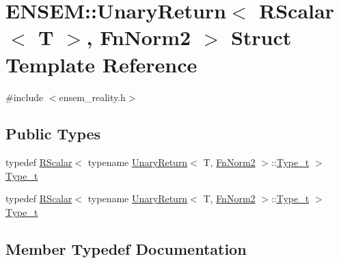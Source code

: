 \hypertarget{structENSEM_1_1UnaryReturn_3_01RScalar_3_01T_01_4_00_01FnNorm2_01_4}{}\section{E\+N\+S\+EM\+:\+:Unary\+Return$<$ R\+Scalar$<$ T $>$, Fn\+Norm2 $>$ Struct Template Reference}
\label{structENSEM_1_1UnaryReturn_3_01RScalar_3_01T_01_4_00_01FnNorm2_01_4}


{\ttfamily \#include $<$ensem\+\_\+reality.\+h$>$}

\subsection*{Public Types}
\begin{DoxyCompactItemize}
\item 
typedef \mbox{\hyperlink{classENSEM_1_1RScalar}{R\+Scalar}}$<$ typename \mbox{\hyperlink{structENSEM_1_1UnaryReturn}{Unary\+Return}}$<$ T, \mbox{\hyperlink{structENSEM_1_1FnNorm2}{Fn\+Norm2}} $>$\+::\mbox{\hyperlink{structENSEM_1_1UnaryReturn_3_01RScalar_3_01T_01_4_00_01FnNorm2_01_4_a0b95acf355311a4c109012c267496961}{Type\+\_\+t}} $>$ \mbox{\hyperlink{structENSEM_1_1UnaryReturn_3_01RScalar_3_01T_01_4_00_01FnNorm2_01_4_a0b95acf355311a4c109012c267496961}{Type\+\_\+t}}
\item 
typedef \mbox{\hyperlink{classENSEM_1_1RScalar}{R\+Scalar}}$<$ typename \mbox{\hyperlink{structENSEM_1_1UnaryReturn}{Unary\+Return}}$<$ T, \mbox{\hyperlink{structENSEM_1_1FnNorm2}{Fn\+Norm2}} $>$\+::\mbox{\hyperlink{structENSEM_1_1UnaryReturn_3_01RScalar_3_01T_01_4_00_01FnNorm2_01_4_a0b95acf355311a4c109012c267496961}{Type\+\_\+t}} $>$ \mbox{\hyperlink{structENSEM_1_1UnaryReturn_3_01RScalar_3_01T_01_4_00_01FnNorm2_01_4_a0b95acf355311a4c109012c267496961}{Type\+\_\+t}}
\end{DoxyCompactItemize}


\subsection{Member Typedef Documentation}
\mbox{\label{structENSEM_1_1UnaryReturn_3_01RScalar_3_01T_01_4_00_01FnNorm2_01_4_a0b95acf355311a4c109012c267496961}} 
